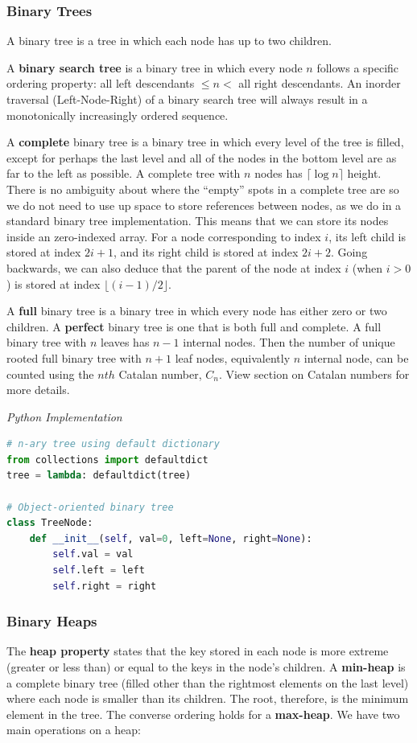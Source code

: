 \documentclass{article}
\begin{document}
    \subsubsection{Binary Trees}
    A binary tree is a tree in which each node has up to two children. 
    
    A \textbf{binary search tree} is a binary tree in which every node $n$ follows a specific ordering property: all left descendants $\leq n <$ all right descendants. An inorder traversal (Left-Node-Right) of a binary search tree will always result in a monotonically increasingly ordered sequence.
    
    A \textbf{complete} binary tree is a binary tree in which every level of the tree is filled, except for perhaps the last level and all of the nodes in the bottom level are as far to the left as possible. A complete tree with $n$ nodes has $\lceil \log n \rceil$ height. There is no ambiguity about where the ``empty'' spots in a complete tree are so we do not need to use up space to store references between nodes, as we do in a standard binary tree implementation. This means that we can store its nodes inside an zero-indexed array. For a node corresponding to index $i$, its left child is stored at index $2i + 1$, and its right child is stored at index $2i + 2$. Going backwards, we can also deduce that the parent of the node at index $i$ (when $i > 0$) is stored at index $\lfloor (i-1)/2 \rfloor$.
    
    A \textbf{full} binary tree is a binary tree in which every node has either zero or two children. A \textbf{perfect} binary tree is one that is both full and complete. A full binary tree with $n$ leaves has $n - 1$ internal nodes. Then the number of unique rooted full binary tree with $n + 1$ leaf nodes, equivalently $n$ internal node, can be counted using the $nth$ Catalan number, $C_n$. View section on Catalan numbers for more details.

\vspace{8pt} \emph{Python Implementation}
\begin{lstlisting}[language=Python]
# n-ary tree using default dictionary
from collections import defaultdict
tree = lambda: defaultdict(tree)

# Object-oriented binary tree
class TreeNode:
    def __init__(self, val=0, left=None, right=None):
        self.val = val
        self.left = left
        self.right = right
\end{lstlisting}
    
    \subsubsection{Binary Heaps}
    The \textbf{heap property} states that the key stored in each node is more extreme (greater or less than) or equal to the keys in the node's children. A \textbf{min-heap} is a complete binary tree (filled other than the rightmost elements on the last level) where each node is smaller than its children. The root, therefore, is the minimum element in the tree. The converse ordering holds for a \textbf{max-heap}. We have two main operations on a heap: 
    
\end{document}
